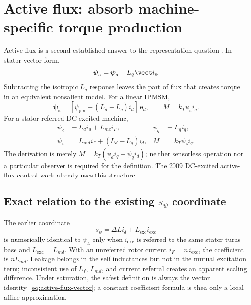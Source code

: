 \section{Active flux: absorb machine-specific torque production}
\label{sec:active-flux-unification}

Active flux is a second established answer to the representation question
\cite{boldea2008}. In stator-vector form,
\begin{equation}
 \boldsymbol\psi_{\mathrm a}=\boldsymbol\psi_{\mathrm s}
 -L_q\vect i_{\mathrm s}.
 \label{eq:active-flux-vector}
\end{equation}
Subtracting the isotropic \(L_q\) response leaves the part of flux that creates
torque in an equivalent nonsalient model. For a linear IPMSM,
\[
 \boldsymbol\psi_{\mathrm a}
 =[\psi_{\mathrm{pm}}+(L_d-L_q)i_d]\,\boldsymbol e_d,
 \qquad M=k_T\psi_{\mathrm a}i_q.
\]
For a stator-referred DC-excited machine,
\begin{align}
 \psi_d&=L_di_d+L_{md}i_F,& \psi_q&=L_qi_q,\\
 \boxed{\psi_{\mathrm a}}&=\boxed{L_{md}i_F+(L_d-L_q)i_d},&
 \boxed{M}&=\boxed{k_T\psi_{\mathrm a}i_q}.
 \label{eq:eesm-active-flux}
\end{align}
The derivation is merely
\(M=k_T(\psi_di_q-\psi_qi_d)\); neither sensorless operation nor a
particular observer is required for the definition. The 2009 DC-excited
active-flux control work already uses this structure
\cite{boldea2009dcactive}.




\subsection{Exact relation to the existing \texorpdfstring{\(s_\psi\)}{s-psi} coordinate}

The earlier coordinate
\[
 s_\psi=\Delta L i_d+L_{\mathrm{exc}}i_{\mathrm{exc}}
\]
is numerically identical to \(\psi_{\mathrm a}\) only when
\(i_{\mathrm{exc}}\) is referred to the same stator turns base and
\(L_{\mathrm{exc}}=L_{md}\). With an unreferred rotor current
\(i_F=n\,i_{\mathrm{exc}}\), the coefficient is \(nL_{md}\). Leakage belongs
in the self inductances but not in the mutual excitation term; inconsistent
use of \(L_f\), \(L_{md}\), and current referral creates an apparent scaling
difference. Under saturation, the safest definition is always the vector
identity~\eqref{eq:active-flux-vector}; a constant coefficient formula is then
only a local affine approximation.


